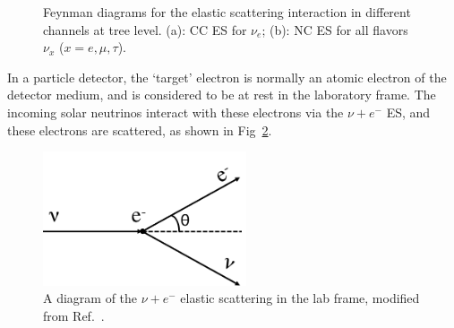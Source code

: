 \begin{figure}[htbp]
	\centering
	\caption[Feynman diagrams for the elastic scattering interaction in different channels at tree level.]{Feynman diagrams for the elastic scattering interaction in different channels at tree level. (a): CC ES for $\nu_e$; (b): NC ES for all flavors $\nu_x$ ($x=e,\mu,\tau$).\label{fig:feynman-es}}
\end{figure}


In a particle detector, the `target' electron is normally an atomic electron of the detector medium, and is considered to be at rest in the laboratory frame. The incoming solar neutrinos interact with these electrons via the $\nu+e^-$ ES, and these electrons are scattered, as shown in Fig~\ref{fig:ESdiagram}. 

\begin{figure}[htbp]
	\centering	
	\includegraphics[width=6cm]{ElasticScatteringCartoon.png}
	\caption{A diagram of the $\nu + e^-$ elastic scattering in the lab frame, modified from Ref.~\cite{giunti2007fundamentals}.	\label{fig:ESdiagram}}
\end{figure}

